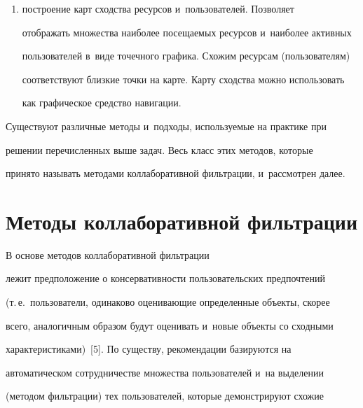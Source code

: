 \begin{enumerate}[(1)]
динамически перестраивать контент сайта;


\item построение карт сходства ресурсов и~пользователей. Позволяет 


отображать множества наиболее посещаемых ресурсов и~наиболее активных 


пользователей в~виде точечного графика. Схожим ресурсам (пользователям) 


соответствуют близкие точки на карте. Карту сходства можно использовать 


как графическое средство навигации.


\end{enumerate}





  Существуют различные методы и~подходы, используемые на практике при 


решении перечисленных выше задач. Весь класс этих методов, которые 


принято называть методами коллаборативной фильтрации, и~рассмотрен далее.





\vspace*{-6pt}


   


\section{Методы коллаборативной фильтрации}





\vspace*{-2pt}





  В основе методов коллаборативной фильтрации 


лежит предположение о консервативности пользовательских предпочтений 


(т.\,е.\ пользователи, одинаково оценивающие определенные объекты, скорее 


всего, аналогичным образом будут оценивать и~новые объекты со сходными 


характеристиками)~[5]. По существу, рекомендации базируются на 


автоматическом сотрудничестве множества пользователей и~на выделении 


(методом фильтрации) тех пользователей, которые демонстрируют схожие 


